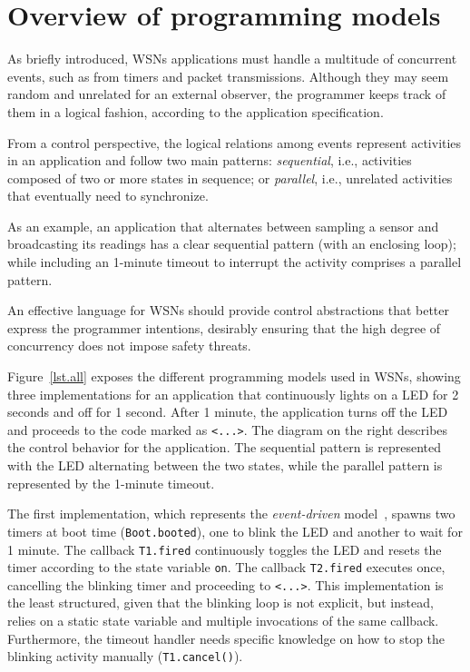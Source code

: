 \documentclass[10pt]{sensys-proc}
\newcommand{\code}[1] {{\small{\texttt{#1}}}}
\begin{document}
\section{Overview of programming models}
\label{sec.overview}

As briefly introduced, WSNs applications must handle a multitude of concurrent 
events, such as from timers and packet transmissions.
Although they may seem random and unrelated for an external observer, the 
programmer keeps track of them in a logical fashion, according to the 
application specification.

From a control perspective, the logical relations among events represent 
activities in an application and follow two main patterns: \emph{sequential}, 
i.e., activities composed of two or more states in sequence; or 
\emph{parallel}, i.e., unrelated activities that eventually need to 
synchronize.

As an example, an application that alternates between sampling a sensor and 
broadcasting its readings has a clear sequential pattern (with an enclosing 
loop); while including an 1-minute timeout to interrupt the activity comprises 
a parallel pattern.

An effective language for WSNs should provide control abstractions that better 
express the programmer intentions, desirably ensuring that the high degree of 
concurrency does not impose safety threats.

Figure~\ref{lst.all} exposes the different programming models used in WSNs, 
showing three implementations for an application that continuously lights on a 
LED for 2 seconds and off for 1 second.
After 1 minute, the application turns off the LED and proceeds to the code 
marked as \code{<...>}.
The diagram on the right describes the control behavior for the application.
The sequential pattern is represented with the LED alternating between the two 
states, while the parallel pattern is represented by the 1-minute timeout.

The first implementation, which represents the \emph{event-driven} 
model~\cite{wsn.nesc,wsn.contiki}, spawns two timers at boot time 
(\code{Boot.booted}), one to blink the LED and another to wait for 1 minute.
The callback \code{T1.fired} continuously toggles the LED and resets the timer 
according to the state variable \code{on}.
The callback \code{T2.fired} executes once, cancelling the blinking timer and 
proceeding to \code{<...>}.
This implementation is the least structured, given that the blinking loop is 
not explicit, but instead, relies on a static state variable and multiple 
invocations of the same callback.
Furthermore, the timeout handler needs specific knowledge on how to stop the 
blinking activity manually (\code{T1.cancel()}).
\end{document}
